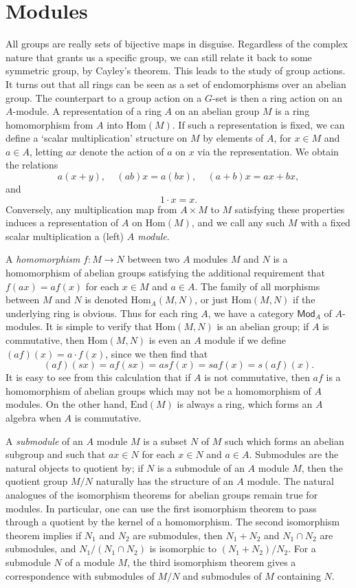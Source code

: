 \chapter{Modules}

All groups are really sets of bijective maps in disguise. Regardless of the complex nature that grants us a specific group, we can still relate it back to some symmetric group, by Cayley's theorem. This leads to the study of group actions. It turns out that all rings can be seen as a set of endomorphisms over an abelian group. The counterpart to a group action on a $G$-set is then a ring action on an $A$-module. A representation of a ring $A$ on an abelian group $M$ is a ring homomorphism from $A$ into $\text{Hom}(M)$. If such a representation is fixed, we can define a `scalar multiplication' structure on $M$ by elements of $A$, for $x \in M$ and $a \in A$, letting $ax$ denote the action of $a$ on $x$ via the representation. We obtain the relations
%
\[ a(x + y),\ \ \ \ \ (ab) x = a(bx),\ \ \ \ \ (a + b)x = ax + bx, \]
%
and
%
\[ 1 \cdot x = x. \]
%
Conversely, any multiplication map from $A \times M$ to $M$ satisfying these properties induces a representation of $A$ on $\text{Hom}(M)$, and we call any such $M$ with a fixed scalar multiplication a (left) \emph{$A$ module}.

A \emph{homomorphism} $f: M \to N$ between two $A$ modules $M$ and $N$ is a homomorphism of abelian groups satisfying the additional requirement that $f(ax) = af(x)$ for each $x \in M$ and $a \in A$. The family of all morphisms between $M$ and $N$ is denoted $\text{Hom}_A(M,N)$, or just $\text{Hom}(M,N)$ if the underlying ring is obvious. Thus for each ring $A$, we have a category $\mathsf{Mod}_A$ of $A$-modules. It is simple to verify that $\text{Hom}(M,N)$ is an abelian group; if $A$ is commutative, then $\text{Hom}(M,N)$ is even an $A$ module if we define $(af)(x) = a \cdot f(x)$, since we then find that
%
\[ (af)(sx) = af(sx) = as f(x) = s af(x) = s (af)(x). \]
%
It is easy to see from this calculation that if $A$ is not commutative, then $af$ is a homomorphism of abelian groups which may not be a homomorphism of $A$ modules. On the other hand, $\text{End}(M)$ is always a ring, which forms an $A$ algebra when $A$ is commutative.

A \emph{submodule} of an $A$ module $M$ is a subset $N$ of $M$ such which forms an abelian subgroup and such that $ax \in N$ for each $x \in N$ and $a \in A$. Submodules are the natural objects to quotient by; if $N$ is a submodule of an $A$ module $M$, then the quotient group $M/N$ naturally has the structure of an $A$ module. The natural analogues of the isomorphism theorems for abelian groups remain true for modules. In particular, one can use the first isomorphism theorem to pass through a quotient by the kernel of a homomorphism. The second isomorphism theorem implies if $N_1$ and $N_2$ are submodules, then $N_1 + N_2$ and $N_1 \cap N_2$ are submodules, and $N_1 / (N_1 \cap N_2)$ is isomorphic to $(N_1 + N_2) / N_2$. For a submodule $N$ of a module $M$, the third isomorphism theorem gives a correspondence with submodules of $M/N$ and submodules of $M$ containing $N$.

